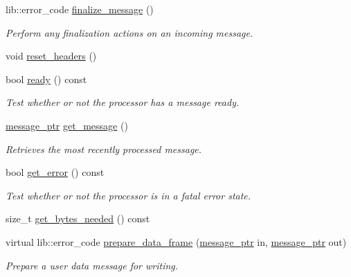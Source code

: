 \begin{DoxyCompactItemize}
lib\+::error\+\_\+code \hyperlink{classwebsocketpp_1_1processor_1_1hybi13_a906398e2c23370de53d4f3572657ad05}{finalize\+\_\+message} ()
\begin{DoxyCompactList}\small\item\em Perform any finalization actions on an incoming message. \end{DoxyCompactList}\item 
void \hyperlink{classwebsocketpp_1_1processor_1_1hybi13_a052dd867709539c0a3f70eb271da70ca}{reset\+\_\+headers} ()
\item 
bool \hyperlink{classwebsocketpp_1_1processor_1_1hybi13_aeeed7b4e8ea542e7114f3adb192a7ebf}{ready} () const 
\begin{DoxyCompactList}\small\item\em Test whether or not the processor has a message ready. \end{DoxyCompactList}\item 
\hyperlink{classwebsocketpp_1_1processor_1_1hybi13_a0571e90d7261ab722f695feb7dd48fed}{message\+\_\+ptr} \hyperlink{classwebsocketpp_1_1processor_1_1hybi13_a8fe09bba8cbe2821ef5c7cf3fd9573cd}{get\+\_\+message} ()
\begin{DoxyCompactList}\small\item\em Retrieves the most recently processed message. \end{DoxyCompactList}\item 
bool \hyperlink{classwebsocketpp_1_1processor_1_1hybi13_ac99ae0c0a349f390f68b40205450da57}{get\+\_\+error} () const 
\begin{DoxyCompactList}\small\item\em Test whether or not the processor is in a fatal error state. \end{DoxyCompactList}\item 
size\+\_\+t \hyperlink{classwebsocketpp_1_1processor_1_1hybi13_a16fc0e56ff4cc31e935f6135d66a5861}{get\+\_\+bytes\+\_\+needed} () const 
\item 
virtual lib\+::error\+\_\+code \hyperlink{classwebsocketpp_1_1processor_1_1hybi13_a72f4833d66eb51e37a956f434895b3ab}{prepare\+\_\+data\+\_\+frame} (\hyperlink{classwebsocketpp_1_1processor_1_1hybi13_a0571e90d7261ab722f695feb7dd48fed}{message\+\_\+ptr} in, \hyperlink{classwebsocketpp_1_1processor_1_1hybi13_a0571e90d7261ab722f695feb7dd48fed}{message\+\_\+ptr} out)
\begin{DoxyCompactList}\small\item\em Prepare a user data message for writing. \end{DoxyCompactList}\item 

\end{DoxyCompactItemize}

